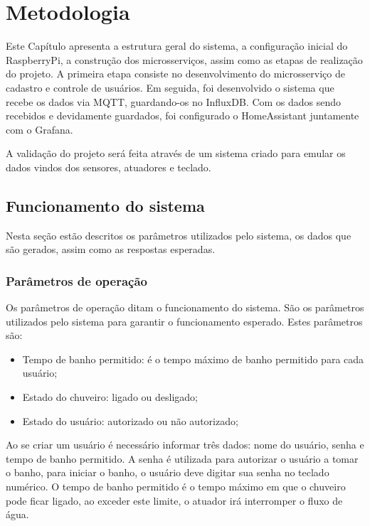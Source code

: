 \chapter{Metodologia}

Este Capítulo apresenta a estrutura geral do sistema, a configuração inicial do RaspberryPi, a construção dos microsserviços, assim como as etapas de realização do projeto. A
primeira etapa consiste no desenvolvimento do microsserviço de cadastro e controle de usuários. Em seguida, foi desenvolvido o sistema que recebe os dados via MQTT, guardando-os no InfluxDB. Com os dados sendo recebidos e devidamente guardados, foi configurado o HomeAssistant juntamente com o Grafana.

A validação do projeto será feita através de um sistema criado para emular os dados vindos dos sensores, atuadores e teclado. %

\section{Funcionamento do sistema} \label{sec:funcionamento}

Nesta seção estão descritos os parâmetros utilizados pelo sistema, os dados que são gerados, assim como as respostas esperadas.

\subsection{Parâmetros de operação}

Os parâmetros de operação ditam o funcionamento do sistema. São os parâmetros utilizados pelo sistema para garantir o funcionamento esperado. Estes parâmetros são:

\begin{itemize}
	\item Tempo de banho permitido: é o tempo máximo de banho permitido para cada usuário;
	\item Estado do chuveiro: ligado ou desligado;
	\item Estado do usuário: autorizado ou não autorizado;
\end{itemize}

Ao se criar um usuário é necessário informar três dados: nome do usuário, senha e tempo de banho permitido. A senha é utilizada para autorizar o usuário a tomar o banho, para iniciar o banho, o usuário deve digitar sua senha no teclado numérico. O tempo de banho permitido é o tempo máximo em que o chuveiro pode ficar ligado, ao exceder este limite, o atuador irá interromper o fluxo de água.

